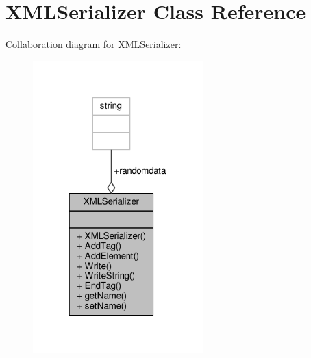 \hypertarget{classXMLSerializer}{}\section{X\+M\+L\+Serializer Class Reference}
\label{classXMLSerializer}


Collaboration diagram for X\+M\+L\+Serializer\+:
\nopagebreak
\begin{figure}[H]
\begin{center}
\leavevmode
\includegraphics[width=187pt]{d9/d13/classXMLSerializer__coll__graph}
\end{center}
\end{figure}

